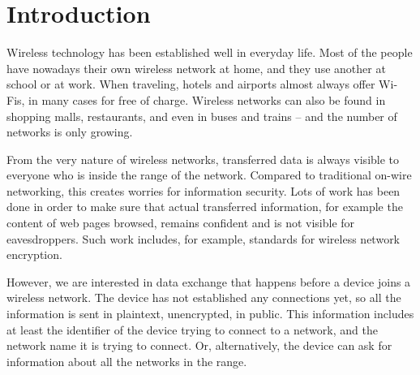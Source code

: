 \documentclass[12pt,a4paper,oneside,pdftex]{report}
\begin{document}


\label{pages-prelude}
\cleardoublepage

\startfirstchapter

\pagestyle{headings}




\chapter{Introduction}
\label{chapter:intro}

Wireless technology has been established well in everyday life. Most of the people have nowadays their own wireless network at home, and they use another at school or at work. When traveling, hotels and airports almost always offer Wi-Fis, in many cases for free of charge. Wireless networks can also be found in shopping malls, restaurants, and even in buses and trains -- and the number of networks is only growing.

From the very nature of wireless networks, transferred data is always visible to everyone who is inside the range of the network. Compared to traditional on-wire networking, this creates worries for information security. Lots of work has been done in order to make sure that actual transferred information, for example the content of web pages browsed, remains confident and is not visible for eavesdroppers. Such work includes, for example, standards for wireless network encryption.

However, we are interested in data exchange that happens before a device joins a wireless network. The device has not established any connections yet, so all the information is sent in plaintext, unencrypted, in public. This information includes at least the identifier of the device trying to connect to a network, and the network name it is trying to connect. Or, alternatively, the device can ask for information about all the networks in the range.
\end{document}
